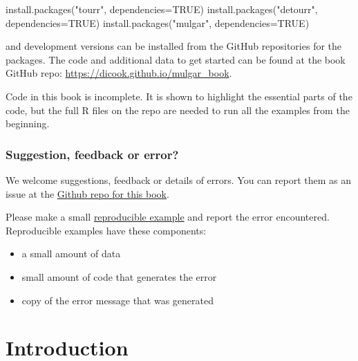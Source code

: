 \documentclass[
  letterpaper,
]{krantz}
\newenvironment{Shaded}{\begin{snugshade}}{\end{snugshade}}
\newcommand{\AttributeTok}[1]{\textcolor[rgb]{0.40,0.45,0.13}{#1}}
\newcommand{\ConstantTok}[1]{\textcolor[rgb]{0.56,0.35,0.01}{#1}}
\newcommand{\FunctionTok}[1]{\textcolor[rgb]{0.28,0.35,0.67}{#1}}
\newcommand{\NormalTok}[1]{\textcolor[rgb]{0.00,0.23,0.31}{#1}}
\newcommand{\StringTok}[1]{\textcolor[rgb]{0.13,0.47,0.30}{#1}}
\providecommand{\tightlist}{%
  \setlength{\itemsep}{0pt}\setlength{\parskip}{0pt}}
\begin{document}
\begin{Shaded}
\begin{Highlighting}[]
\FunctionTok{install.packages}\NormalTok{(}\StringTok{"tourr"}\NormalTok{, }\AttributeTok{dependencies=}\ConstantTok{TRUE}\NormalTok{)}
\FunctionTok{install.packages}\NormalTok{(}\StringTok{"detourr"}\NormalTok{, }\AttributeTok{dependencies=}\ConstantTok{TRUE}\NormalTok{)}
\FunctionTok{install.packages}\NormalTok{(}\StringTok{"mulgar"}\NormalTok{, }\AttributeTok{dependencies=}\ConstantTok{TRUE}\NormalTok{)}
\end{Highlighting}
\end{Shaded}

and development versions can be installed from the GitHub repositories
for the packages. The code and additional data to get started can be
found at the book GitHub repo:
\url{https://dicook.github.io/mulgar_book}.

Code in this book is incomplete. It is shown to highlight the essential
parts of the code, but the full R files on the repo are needed to run
all the examples from the beginning.

\section*{Suggestion, feedback or
error?}\label{suggestion-feedback-or-error}


We welcome suggestions, feedback or details of errors. You can report
them as an issue at the
\href{https://github.com/dicook/mulgar_book}{Github repo for this book}.

Please make a small \href{https://reprex.tidyverse.org}{reproducible
example} and report the error encountered. Reproducible examples have
these components:

\begin{itemize}
\tightlist
\item
  a small amount of data
\item
  small amount of code that generates the error
\item
  copy of the error message that was generated
\end{itemize}

\part{Introduction}
\end{document}
